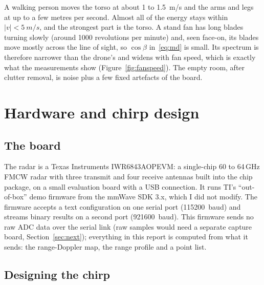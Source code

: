 \documentclass[11pt,a4paper]{article}
\begin{document}
A walking person moves the torso at about 1 to \SI{1.5}{m/s} and the arms and legs at up to a few metres per second. Almost all of the energy stays within $|v| < \SI{5}{m/s}$, and the strongest part is the torso. A stand fan has long blades turning slowly (around 1000 revolutions per minute) and, seen face-on, its blades move mostly across the line of sight, so $\cos\beta$ in~\eqref{eq:md} is small. Its spectrum is therefore narrower than the drone's and widens with fan speed, which is exactly what the measurements show (Figure~\ref{fig:fanspeed}). The empty room, after clutter removal, is noise plus a few fixed artefacts of the board.

\section{Hardware and chirp design}\label{sec:hardware}

\subsection{The board}

The radar is a Texas Instruments IWR6843AOPEVM: a single-chip 60 to 64\,GHz FMCW radar with three transmit and four receive antennas built into the chip package, on a small evaluation board with a USB connection. It runs TI's ``out-of-box'' demo firmware from the mmWave SDK 3.x, which I did not modify. The firmware accepts a text configuration on one serial port (\SI{115200}{baud}) and streams binary results on a second port (\SI{921600}{baud}). This firmware sends no raw ADC data over the serial link (raw samples would need a separate capture board, Section~\ref{sec:next}); everything in this report is computed from what it sends: the range-Doppler map, the range profile and a point list.

\subsection{Designing the chirp}
\end{document}
